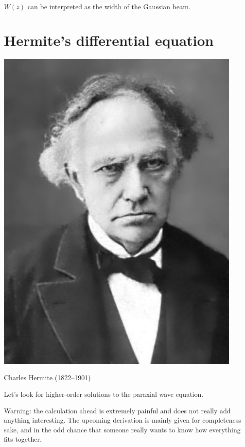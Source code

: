 $W(z)$ can be interpreted as the width of the Gaussian beam.

\pagebreak

\section{Hermite's differential equation}

\begin{marginfigure}[0cm]
  \includegraphics{hermite/figures/c_hermite}
  \caption{Charles Hermite (1822–1901)}
  \end{marginfigure}

Let's look for higher-order solutions to the paraxial wave equation. 

Warning: the calculation ahead is extremely painful and does not really add anything interesting. The upcoming derivation is mainly given for completeness sake, and in the odd chance that someone really wants to know how everything fits together.


